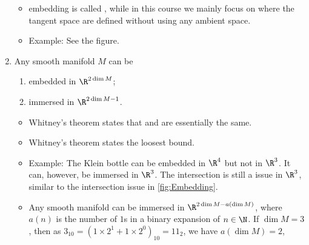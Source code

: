 \documentclass{article}
\begin{document}
\begin{enumerate}
\begin{itemize}
    \item embedding is called , while in this course we mainly focus on  where the tangent space are defined without using any ambient space.
    \item Example: See the figure.
\end{itemize}
\item {}
Any smooth manifold $M$ can be
\begin{enumerate}
\item embedded in $\R^{2\dim M}$;
\item immersed in $\R^{2\dim M-1}$.
\end{enumerate}
\begin{itemize}
    \item Whitney's theorem states that  and   are essentially the same.
    \item Whitney's theorem states the loosest bound.
    \item Example: The Klein bottle can be embedded in $\R^4$ but not in $\R^3$. It can, however, be immersed in $\R^3$. The intersection is still a issue in  $\R^3$, similar to the intersection issue in \cref{fig:Embedding}.
    \item {} Any smooth manifold can be immersed in $\R^{2\dim M-a(\dim M)}$, where $a(n)$ is the number of $1$s in a binary expansion of $n\in \N$. If $\dim M = 3$, then as  $3_{10}=(1\times 2^1+1\times 2^0)_{10}=11_2$, we have $a(\dim M)=2$, 
\end{itemize}



\end{enumerate}
\end{document}
